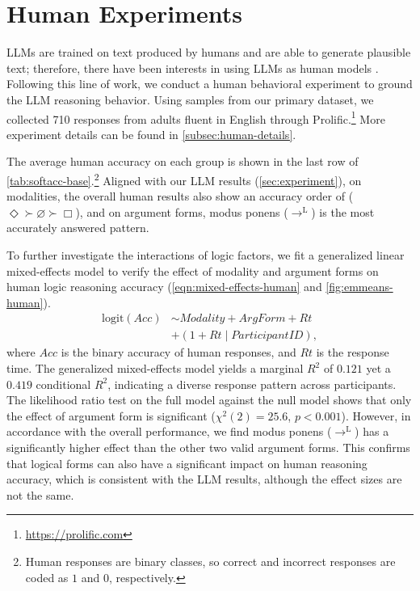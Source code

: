\section{Human Experiments}
\label{sec:human}

LLMs are trained on text produced by humans and are able to generate plausible text; therefore, there have been interests in using LLMs as human models .
Following this line of work, we conduct a human behavioral experiment to ground the LLM reasoning behavior.
Using samples from our primary dataset, we collected 710 responses from adults fluent in English through Prolific.\footnote{\url{https://prolific.com}}
More experiment details can be found in \cref{subsec:human-details}.

The average human accuracy on each group is shown in the last row of \cref{tab:softacc-base}.\footnote{Human responses are binary classes, so correct and incorrect responses are coded as $1$ and $0$, respectively.}
Aligned with our LLM results (\cref{sec:experiment}), on modalities, the overall human results also show an accuracy order of ($\Diamond \succ \varnothing \succ \Box$),
and on argument forms, modus ponens ($\to^\mathrm{L}$) is the most accurately answered pattern.

To further investigate the interactions of logic factors, we fit a generalized linear mixed-effects model \citep{batesFittingLinearMixedEffects2015} to verify the effect of modality and argument forms on human logic reasoning accuracy (\cref{eqn:mixed-effects-human} and \cref{fig:emmeans-human}).
\noindent
\begin{align}
    \mathrm{logit}(\mathit{Acc}) & \sim \textit{Modality} + \textit{ArgForm} + \textit{Rt} \nonumber \\
                                 & + (1 + \textit{Rt} \mid \textit{ParticipantID}),
    \label{eqn:mixed-effects-human}
\end{align}
\noindent
where $\mathit{Acc}$ is the binary accuracy of human responses, and $\textit{Rt}$ is the response time.
The generalized mixed-effects model yields a marginal $R^2$ of $0.121$ yet a $0.419$ conditional $R^2$, indicating a diverse response pattern across participants.
The likelihood ratio test on the full model against the null model shows that only the effect of argument form is significant ($\chi^2(2)=25.6$, $p<0.001$).
However, in accordance with the overall performance, we find modus ponens ($\to^\mathrm{L}$) has a significantly higher effect than the other two valid argument forms.
This confirms that logical forms can also have a significant impact on human reasoning accuracy, which is consistent with the LLM results, although the effect sizes are not the same.


